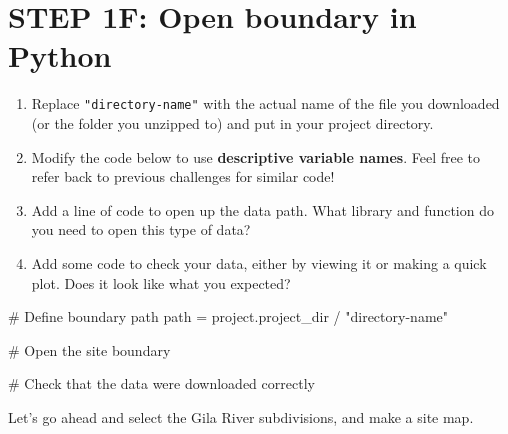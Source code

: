 \documentclass[
  letterpaper,
  DIV=11,
  numbers=noendperiod,
  oneside]{scrreprt}
\newenvironment{Shaded}{\begin{snugshade}}{\end{snugshade}}
\newcommand{\CommentTok}[1]{\textcolor[rgb]{0.37,0.37,0.37}{#1}}
\newcommand{\NormalTok}[1]{\textcolor[rgb]{0.00,0.23,0.31}{#1}}
\newcommand{\OperatorTok}[1]{\textcolor[rgb]{0.37,0.37,0.37}{#1}}
\newcommand{\StringTok}[1]{\textcolor[rgb]{0.13,0.47,0.30}{#1}}
\providecommand{\tightlist}{%
  \setlength{\itemsep}{0pt}\setlength{\parskip}{0pt}}
\begin{document}
\section{STEP 1F: Open boundary in
Python}\label{step-1f-open-boundary-in-python}

\begin{tcolorbox}[enhanced jigsaw, colbacktitle=quarto-callout-color!10!white, opacityback=0, bottomtitle=1mm, toptitle=1mm, bottomrule=.15mm, left=2mm, colframe=quarto-callout-color-frame, leftrule=.75mm, opacitybacktitle=0.6, colback=white, rightrule=.15mm, toprule=.15mm, breakable, titlerule=0mm, title=\textcolor{quarto-callout-color}{\faInfo}\hspace{0.5em}{Try It}, coltitle=black, arc=.35mm]

\begin{enumerate}
\def\labelenumi{\arabic{enumi}.}
\tightlist
\item
  Replace \texttt{"directory-name"} with the actual name of the file you
  downloaded (or the folder you unzipped to) and put in your project
  directory.
\item
  Modify the code below to use \textbf{descriptive variable names}. Feel
  free to refer back to previous challenges for similar code!
\item
  Add a line of code to open up the data path. What library and function
  do you need to open this type of data?
\item
  Add some code to check your data, either by viewing it or making a
  quick plot. Does it look like what you expected?
\end{enumerate}

\end{tcolorbox}

\begin{Shaded}
\begin{Highlighting}[]
\CommentTok{\# Define boundary path}
\NormalTok{path }\OperatorTok{=}\NormalTok{ project.project\_dir }\OperatorTok{/} \StringTok{"directory{-}name"}

\CommentTok{\# Open the site boundary}


\CommentTok{\# Check that the data were downloaded correctly}
\end{Highlighting}
\end{Shaded}

Let's go ahead and select the Gila River subdivisions, and make a site
map.
\end{document}
